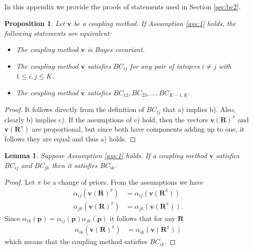 \documentclass[pdflatex, sn-basic]{sn-jnl}%
\newtheorem{prop}{Proposition}
\newtheorem{lem}{Lemma}
\theoremstyle{thmstyleone}%
\theoremstyle{thmstyletwo}%
\theoremstyle{thmstylethree}%
\begin{document}
\begin{appendices}

\appendix

\section{}
\label{app:bc1}

In this appendix we provide the proofs of statements used in Section \ref{sec:bc2}.

\begin{prop} \label{prop:bcprop}
	Let $\boldsymbol{v}$ be a coupling method. If Assumption \ref{ass:1} holds, the following statements are equivalent:
	\begin{itemize}
		\item[a)] The coupling method $\boldsymbol{v}$ is Bayes covariant.
		\item[b)] The coupling method $\boldsymbol{v}$ satisfies $BC_{ij}$ for any pair of integers  $i\not= j$ with $1\leq i,j \leq K$.
		\item[c)] The coupling method $\boldsymbol{v}$ satisfies $BC_{12}, BC_{23}, \ldots, BC_{K-1,K}$.
	\end{itemize}
\end{prop}
\begin{proof}
It follows directly from the definition of $BC_{ij}$ that a) implies b). Also, clearly b) implies c). If the assumptions of c) hold, then the vectors $\boldsymbol{v}(\boldsymbol{R})^\pi$ and $ \boldsymbol{v}(\boldsymbol{R}^\pi)$ are proportional, but since both have components adding up to one, it follows they are equal and thus a) holds.
\end{proof}

\begin{lem} \label{lem:transitivity}
	Suppose Assumption \ref{ass:1} holds. If a coupling method $\boldsymbol{v}$ satisfies $BC_{ij}$ and $BC_{jk}$ then it satisfies $BC_{ik}$.
\end{lem}
\begin{proof}
	Let $\pi$ be a change of priors. From the assumptions we have 
	\begin{align}
		\alpha_{ij}(\boldsymbol{v}(\boldsymbol{R})^\pi ) &= \alpha_{ij}(\boldsymbol{v}(\boldsymbol{R}^\pi) ) \\
		\alpha_{jk}(\boldsymbol{v}(\boldsymbol{R})^\pi ) &= \alpha_{jk}(\boldsymbol{v}(\boldsymbol{R}^\pi) ).
	\end{align}
	Since $\alpha_{ik}(\boldsymbol{p}) = \alpha_{ij}(\boldsymbol{p})  \alpha_{jk}(\boldsymbol{p})$ it follows that for any $\boldsymbol{R}$
	\begin{align}
		\alpha_{ik}(\boldsymbol{v}(\boldsymbol{R})^\pi ) &= \alpha_{ik}(\boldsymbol{v}(\boldsymbol{R}^\pi) )
	\end{align}
	which means that the coupling method satisfies $BC_{ik}$.
\end{proof}


\end{appendices}
\end{document}

